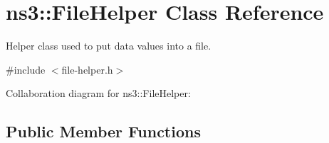 \hypertarget{classns3_1_1FileHelper}{}\section{ns3\+:\+:File\+Helper Class Reference}
\label{classns3_1_1FileHelper}


Helper class used to put data values into a file.  




{\ttfamily \#include $<$file-\/helper.\+h$>$}



Collaboration diagram for ns3\+:\+:File\+Helper\+:
\subsection*{Public Member Functions}
